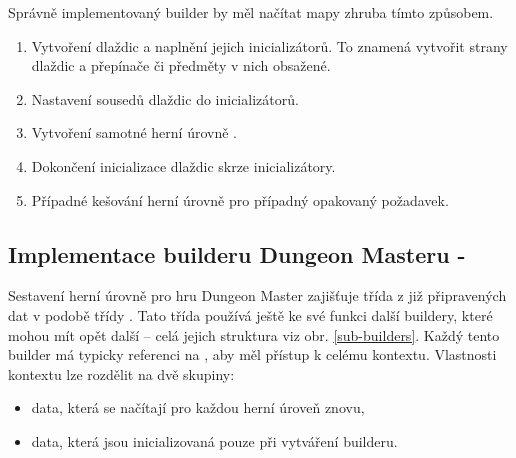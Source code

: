 Správně implementovaný builder by měl načítat mapy zhruba tímto způsobem. 

\begin{enumerate}

\item Vytvoření dlaždic a naplnění jejich inicializátorů. 
To znamená vytvořit strany dlaždic a přepínače či předměty v nich obsažené.

\item Nastavení sousedů dlaždic do inicializátorů. 

\item Vytvoření samotné herní úrovně .

\item Dokončení inicializace dlaždic skrze inicializátory. 

\item Případné kešování herní úrovně pro případný opakovaný požadavek. 
\end{enumerate}


\subsection{Implementace builderu Dungeon Masteru - }
Sestavení herní úrovně pro hru Dungeon Master zajišťuje třída  z již připravených dat
v podobě třídy . Tato třída používá ještě ke své funkci další buildery, které mohou mít
opět další -- celá jejich struktura viz obr. \ref{sub-builders}. Každý tento builder má typicky referenci
na , aby měl přístup k celému kontextu. Vlastnosti kontextu lze rozdělit na dvě skupiny:
\begin{itemize}
\item data, která se načítají pro každou herní úroveň znovu,
\item data, která jsou inicializovaná pouze při vytváření builderu. 
\end{itemize}

